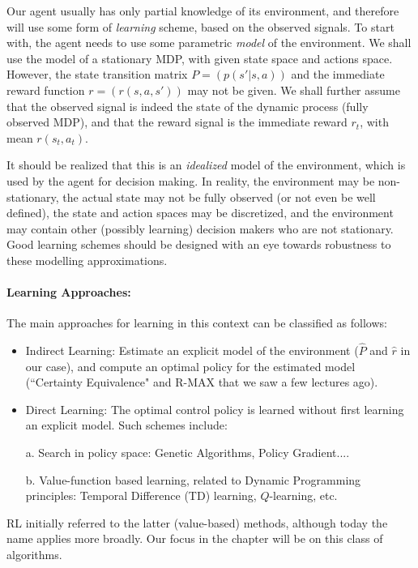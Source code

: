 Our agent usually has only partial knowledge of its environment, and therefore
will use some form of {\em learning} scheme, based on the observed signals.
To start with, the agent needs to use some parametric {\em model} of the environment.
We shall use the model of a stationary MDP, with given state space and actions space.
However, the state transition matrix $P=(p(s'|s,a))$ and the immediate reward function
$r=(r(s,a,s'))$ may not be given.
We shall further assume that the observed signal is indeed the state of the
dynamic process (fully observed MDP), and that the reward signal is the immediate
reward $r_t$, with mean $r(s_t,a_t)$.

It should be realized that this is an {\em idealized} model of the environment,
which is used by the agent for decision making. In reality, the environment
may be non-stationary, the actual state may not be fully observed (or not even be
well defined), the state and action spaces may be discretized, and the environment
may contain other (possibly learning) decision makers who are not stationary.
Good learning schemes should be designed with an eye towards robustness to these modelling
approximations.


\paragraph{Learning Approaches:} The main approaches for learning in this context can
be classified as follows:
\begin{itemize}
\item Indirect Learning: Estimate an explicit model of the environment
($\hat{P}$ and $\hat{r}$ in our case),
and compute an optimal policy for the estimated model (``Certainty Equivalence" and R-MAX that we saw a few lectures ago).
\item Direct Learning: The optimal control policy is learned without first learning
an explicit model. Such schemes include:

a. Search in policy space: Genetic Algorithms, Policy Gradient....

b.  Value-function based learning, related to Dynamic Programming principles:
 Temporal Difference (TD) learning, $Q$-learning, etc.
\end{itemize}
RL initially referred to the latter (value-based) methods, although
today the name applies more broadly. Our focus in the chapter will be
on this class of algorithms.


